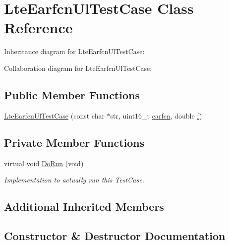 \hypertarget{classLteEarfcnUlTestCase}{}\section{Lte\+Earfcn\+Ul\+Test\+Case Class Reference}
\label{classLteEarfcnUlTestCase}


Inheritance diagram for Lte\+Earfcn\+Ul\+Test\+Case\+:


Collaboration diagram for Lte\+Earfcn\+Ul\+Test\+Case\+:
\subsection*{Public Member Functions}
\begin{DoxyCompactItemize}
\item 
\hyperlink{classLteEarfcnUlTestCase_aca38942a692626c35ee428072bad630b}{Lte\+Earfcn\+Ul\+Test\+Case} (const char $\ast$str, uint16\+\_\+t \hyperlink{generate__test__data__lte__spectrum__value__txpsd_8m_a584be7562abb392609629331f8c6c42c}{earfcn}, double \hyperlink{80211b_8c_ae7ffc1a8f84fa47a0812b2f2b9627132}{f})
\end{DoxyCompactItemize}
\subsection*{Private Member Functions}
\begin{DoxyCompactItemize}
\item 
virtual void \hyperlink{classLteEarfcnUlTestCase_a8c5b358f1a5dd3abc1fec0d743bbbf73}{Do\+Run} (void)
\begin{DoxyCompactList}\small\item\em Implementation to actually run this Test\+Case. \end{DoxyCompactList}\end{DoxyCompactItemize}
\subsection*{Additional Inherited Members}


\subsection{Constructor \& Destructor Documentation}
